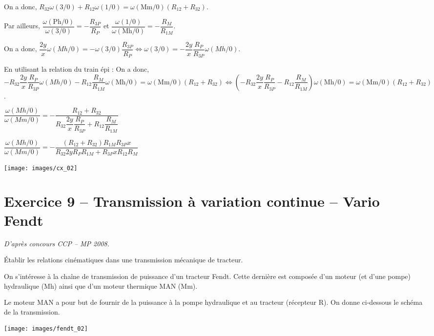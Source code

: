 \documentclass[10pt,fleqn]{article} %
\begin{document}
\begin{multicols}{2}
\begin{corrige}
On a donc, $R_{32} \omega(3/0) +R_{12}\omega(1/0) = \omega(\text{Mm}/0)\left(R_{12}+R_{32}\right)$.

Par ailleurs, $\dfrac{\omega(\text{Ph}/0)}{\omega(3/0)} = -\dfrac{R_{3P}}{R_P}$ et 
$\dfrac{\omega(1/0)}{\omega(\text{Mh}/0)} = -\dfrac{R_M}{R_{1M}}$.

On a donc, $ \dfrac{2y}{x} \omega(Mh/0)= -\omega(3/0)\dfrac{R_{3P}}{R_P} \Leftrightarrow  \omega(3/0) = -\dfrac{2y}{x} \dfrac{R_P}{R_{3P}}\omega(Mh/0)$.

En utilisant la relation du train épi :
On a donc, $-R_{32} \dfrac{2y}{x} \dfrac{R_P}{R_{3P}}\omega(Mh/0)  -R_{12} \dfrac{R_M}{R_{1M}} \omega(\text{Mh}/0) = \omega(\text{Mm}/0)\left(R_{12}+R_{32}\right) \Leftrightarrow \left(-R_{32} \dfrac{2y}{x} \dfrac{R_P}{R_{3P}}  -R_{12} \dfrac{R_M}{R_{1M}} \right)\omega(\text{Mh}/0) = \omega(\text{Mm}/0)\left(R_{12}+R_{32}\right)$.


$\dfrac{\omega(Mh/0)}{\omega(Mm/0)}=-\dfrac{R_{12}+R_{32}}{R_{32} \dfrac{2y}{x} \dfrac{R_P}{R_{3P}}  +R_{12} \dfrac{R_M}{R_{1M}}}$

$\dfrac{\omega(Mh/0)}{\omega(Mm/0)}=-\dfrac{\left( R_{12}+R_{32}\right)R_{1M} R_{3P}x }{R_{32} 2y R_PR_{1M} + R_{3P}xR_{12} R_M}$
\end{corrige}
\else
\fi

 
\begin{center}
\texttt{[image: images/cx\_02]}
\end{center}

\section*{Exercice 9 -- Transmission à variation continue -- Vario Fendt}
\setcounter{exo}{0}

\textit{D'après concours CCP -- MP 2008.}

\begin{obj} 
Établir les relations cinématiques dans une transmission mécanique de tracteur.
\end{obj}


On s'intéresse à la chaîne de transmission de puissance d'un tracteur Fendt. Cette dernière est composée d'un moteur (et d'une pompe) hydraulique (Mh) ainsi que d'un moteur thermique MAN (Mm). 

Le moteur MAN a pour but de fournir de la puissance à la pompe hydraulique et au tracteur (récepteur R). On donne ci-dessous le schéma de la transmission. 
 
\begin{center}
\texttt{[image: images/fendt\_02]}
\end{center}


\end{multicols}
\end{document}
